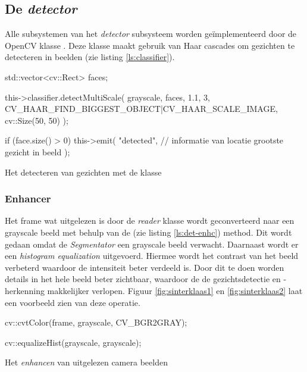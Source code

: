 \subsection{De \emph{detector}}

Alle subsystemen van het \emph{detector} subsysteem worden geïmplementeerd door
de OpenCV klasse . Deze klasse maakt gebruik van
Haar cascades om gezichten te detecteren in beelden (zie listing \ref{ls:classifier}).

\begin{listing}[H]
    \begin{cppcode}
    std::vector<cv::Rect> faces;

    this->classifier.detectMultiScale(
        grayscale,
        faces,
        1.1,
        3,
        CV_HAAR_FIND_BIGGEST_OBJECT|CV_HAAR_SCALE_IMAGE,
        cv::Size(50, 50)
    );

    if (face.size() > 0) {
        this->emit(
            "detected",
            // informatie van locatie grootste gezicht in beeld
        );
    }
    \end{cppcode}
    \caption{Het detecteren van gezichten met de  klasse}
    \label{ls:classifier}
\end{listing}

\subsubsection{Enhancer}

Het frame wat uitgelezen is door de \emph{reader} klasse wordt geconverteerd
naar een grayscale beeld met behulp van de  (zie listing \ref{ls:det-enhc})
method. Dit wordt gedaan omdat de \emph{Segmentator} een grayscale beeld verwacht.
Daarnaast wordt er een \emph{histogram equalization} uitgevoerd. Hiermee wordt
het contrast van het beeld verbeterd waardoor de intensiteit beter verdeeld is.
Door dit te doen worden details in het hele beeld beter zichtbaar, waardoor de
de gezichtsdetectie en -herkenning makkelijker verlopen. Figuur \ref{fig:sinterklaas1}
en \ref{fig:sinterklaas2} laat een voorbeeld zien van deze operatie.

\begin{listing}[H]
    \begin{cppcode}
    cv::cvtColor(frame, grayscale, CV_BGR2GRAY);

    cv::equalizeHist(grayscale, grayscale);
    \end{cppcode}
    \caption{Het \emph{enhancen} van uitgelezen camera beelden}
    \label{ls:det-enhc}
\end{listing}

